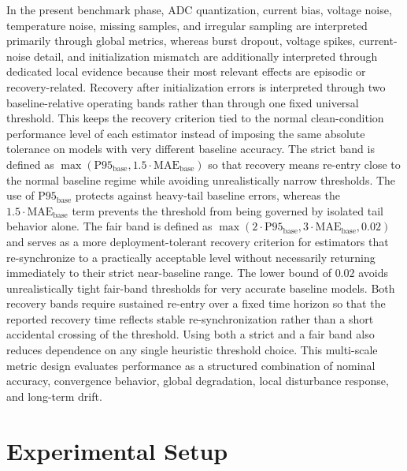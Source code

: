 \documentclass[review]{elsarticle}
\begin{document}
In the present benchmark phase, ADC quantization, current bias, voltage noise, temperature noise, missing samples, and irregular sampling are interpreted primarily through global metrics, whereas burst dropout, voltage spikes, current-noise detail, and initialization mismatch are additionally interpreted through dedicated local evidence because their most relevant effects are episodic or recovery-related. Recovery after initialization errors is interpreted through two baseline-relative operating bands rather than through one fixed universal threshold. This keeps the recovery criterion tied to the normal clean-condition performance level of each estimator instead of imposing the same absolute tolerance on models with very different baseline accuracy. The strict band is defined as $\max(\mathrm{P95}_{\mathrm{base}},1.5 \cdot \mathrm{MAE}_{\mathrm{base}})$ so that recovery means re-entry close to the normal baseline regime while avoiding unrealistically narrow thresholds. The use of $\mathrm{P95}_{\mathrm{base}}$ protects against heavy-tail baseline errors, whereas the $1.5 \cdot \mathrm{MAE}_{\mathrm{base}}$ term prevents the threshold from being governed by isolated tail behavior alone. The fair band is defined as $\max(2 \cdot \mathrm{P95}_{\mathrm{base}},3 \cdot \mathrm{MAE}_{\mathrm{base}},0.02)$ and serves as a more deployment-tolerant recovery criterion for estimators that re-synchronize to a practically acceptable level without necessarily returning immediately to their strict near-baseline range. The lower bound of $0.02$ avoids unrealistically tight fair-band thresholds for very accurate baseline models. Both recovery bands require sustained re-entry over a fixed time horizon so that the reported recovery time reflects stable re-synchronization rather than a short accidental crossing of the threshold. Using both a strict and a fair band also reduces dependence on any single heuristic threshold choice. This multi-scale metric design evaluates performance as a structured combination of nominal accuracy, convergence behavior, global degradation, local disturbance response, and long-term drift.

\section{Experimental Setup}
\end{document}
